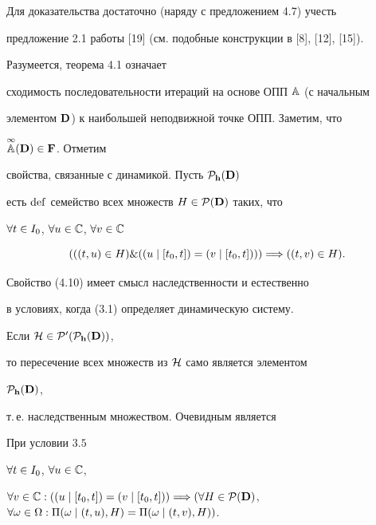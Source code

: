 Для доказательства достаточно (наряду с предложением 4.7) учесть


предложение 2.1 работы [19] (см. подобные конструкции в [8], [12], [15]).


Разумеется, теорема 4.1 означает


сходимость последовательности итераций на основе ОПП ${\Bbb A}$ (с начальным


элементом ${\bold D}$) к наибольшей неподвижной точке ОПП. Заметим, что


$\overset{\infty}{\Bbb A}{}({\bold D}) \in {\bold F}$. Отметим


свойства, связанные с динамикой. Пусть ${{\cal P}_{\bold h}}({\bold D})$


есть $\operatorname{def}$ семейство всех множеств $H \in {{\cal P}({\bold D})}$ таких, что


$\forall{t} \in {I_0}$, $\forall{u} \in {\Bbb C}$, $\forall{v} \in {\Bbb C}$


\begin{equation}


(((t,u) \in H) \& ((u \mid [{t_0},t]) = (v \mid [{t_0},t]))) \Lo


((t,v) \in H).


\end{equation}


Свойство (4.10) имеет смысл наследственности и естественно


в условиях, когда (3.1) определяет динамическую систему.


Если ${\cal H} \in {{\cal P}'}({{\cal P}_{\bold h}}({\bold D}))$,


то пересечение всех множеств из ${\cal H}$ само является элементом


${{\cal P}_{\bold h}}({\bold D})$,


т.\,е. наследственным множеством. Очевидным является





\begin{props}


При условии $3.5$\;


$\forall{t} \in {I_0}$, $\forall{u} \in {\Bbb C}$,


$\fo{v} \in {\Bbb C}:


((u \mid [{t_0},t]) = (v \mid [{t_0},t])) \Lo (\fo{H} \in {{\cal


P}({\bold D})}$, $\fo{\omega} \in \Om:{\Pi}(\omega \mid (t,u),H) =


{\Pi}(\omega \mid (t,v),H))$.


\end{props}






